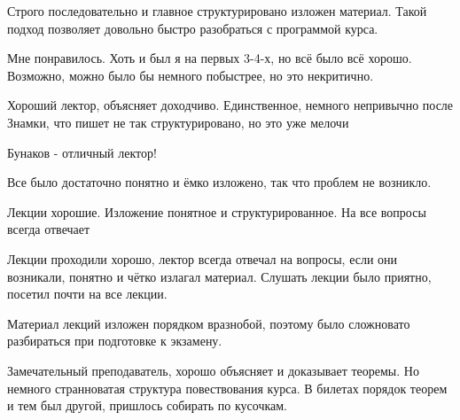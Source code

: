             \begin{commentbox} 
                Строго последовательно и главное структурировано изложен материал. Такой подход позволяет довольно быстро разобраться с программой курса. 
            \end{commentbox} 
        
            \begin{commentbox} 
                Мне понравилось. Хоть и был я на первых 3-4-х, но всё было всё хорошо. Возможно, можно было бы немного побыстрее, но это некритично.  
            \end{commentbox} 
        
            \begin{commentbox} 
                Хороший лектор, объясняет доходчиво. Единственное, немного непривычно после Знамки, что пишет не так структурировано, но это уже мелочи 
            \end{commentbox} 
        
            \begin{commentbox} 
                Бунаков - отличный лектор!  
            \end{commentbox} 
        
            \begin{commentbox} 
                Все было достаточно понятно и ёмко изложено, так что проблем не возникло. 
            \end{commentbox} 
        
            \begin{commentbox} 
                Лекции хорошие. Изложение понятное и структурированное. На все вопросы всегда отвечает 
            \end{commentbox} 
        
            \begin{commentbox} 
                Лекции проходили хорошо, лектор всегда отвечал на вопросы, если они возникали, понятно и чётко излагал материал. Слушать лекции было приятно, посетил почти на все лекции. 
            \end{commentbox} 
        
            \begin{commentbox} 
                Материал лекций изложен порядком вразнобой, поэтому было сложновато разбираться при подготовке к экзамену. 
            \end{commentbox} 
        
            \begin{commentbox} 
                Замечательный преподаватель, хорошо объясняет и доказывает теоремы. Но немного странноватая структура повествования курса. В билетах порядок теорем и тем был другой, пришлось собирать по кусочкам. 
            \end{commentbox} 
        
